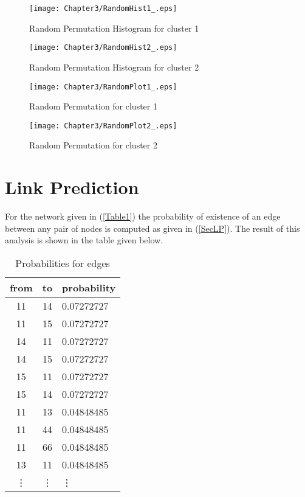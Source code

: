 \begin{figure}[htb]
\centering
\begin{minipage}{0.45\linewidth}
\texttt{[image: Chapter3/RandomHist1\_.eps]}
\caption{Random Permutation Histogram for cluster 1}
\end{minipage}
\quad
\begin{minipage}{0.45\linewidth}
\texttt{[image: Chapter3/RandomHist2\_.eps]}
\caption{Random Permutation Histogram for cluster 2}
\end{minipage}
\end{figure}
\pagebreak

\begin{figure}[htb]
\centering
\begin{minipage}{0.45\linewidth}
\texttt{[image: Chapter3/RandomPlot1\_.eps]}
\caption{Random Permutation for cluster 1}
\end{minipage}
\quad
\begin{minipage}{0.45\linewidth}
\texttt{[image: Chapter3/RandomPlot2\_.eps]}
\caption{Random Permutation for cluster 2}
\end{minipage}
\end{figure}

\section{Link Prediction}
 
For the network given in (\ref{Table1}) the probability of existence of an edge between any pair of nodes is computed as given in (\ref{SecLP}).
The result of this analysis is shown in the table given below.
  
\begin{table}[htb]
\caption{Probabilities for edges}
\begin{tabular}{ccl}\hline
from & to & probability\\ \hline
11 & 14 & 0.07272727\\
11 & 15 & 0.07272727\\
14 & 11 & 0.07272727\\
14 & 15 & 0.07272727\\
15 & 11 & 0.07272727\\
15 & 14 & 0.07272727\\
11 & 13 & 0.04848485\\
11 & 44 & 0.04848485\\
11 & 66 & 0.04848485\\
13 & 11 & 0.04848485\\
\vdots&\vdots&\vdots\\ \hline
\end{tabular}\label{Table2}
\end{table}

